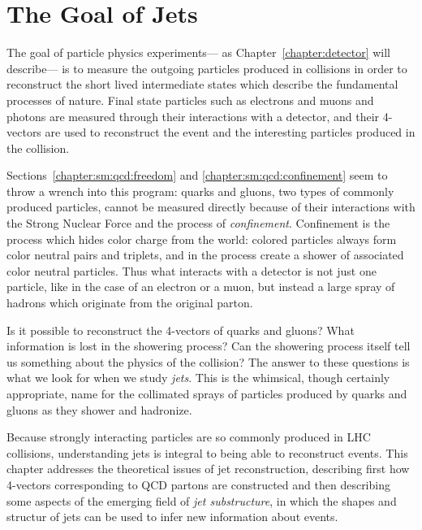 \label{chapter:jets-and-substructure}
\section{The Goal of Jets}

The goal of particle physics experiments--- as Chapter~\ref{chapter:detector} will describe--- is to measure the outgoing particles produced in collisions in order to reconstruct the short lived intermediate states which describe the fundamental processes of nature. Final state particles such as electrons and muons and photons are measured through their interactions with a detector, and their 4-vectors are used to reconstruct the event and the interesting particles produced in the collision. 

Sections~\ref{chapter:sm:qcd:freedom} and \ref{chapter:sm:qcd:confinement} seem to throw a wrench into this program: quarks and gluons, two types of commonly produced particles, cannot be measured directly because of their interactions with the Strong Nuclear Force and the process of \textit{confinement}. Confinement is the process which hides color charge from the world: colored particles always form color neutral pairs and triplets, and in the process create a shower of associated color neutral particles. Thus what interacts with a detector is not just one particle, like in the case of an electron or a muon, but instead a large spray of hadrons which originate from the original parton.

Is it possible to reconstruct the 4-vectors of quarks and gluons? What information is lost in the showering process? Can the showering process itself tell us something about the physics of the collision? The answer to these questions is what we look for when we study \textit{jets}. This is the whimsical, though certainly appropriate, name for the collimated sprays of particles produced by quarks and gluons as they shower and hadronize. 

Because strongly interacting particles are so commonly produced in LHC collisions, understanding jets is integral to being able to reconstruct events. This chapter addresses the theoretical issues of jet reconstruction, describing first how 4-vectors corresponding to QCD partons are constructed and then describing some aspects of the emerging field of \textit{jet substructure}, in which the shapes and structur of jets can be used to infer new information about events.



